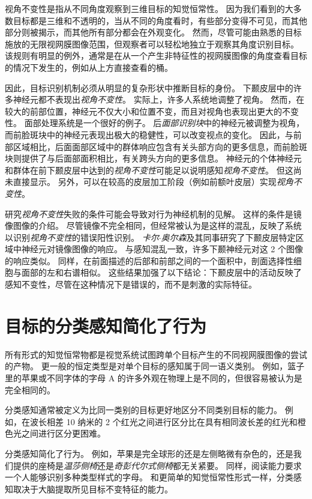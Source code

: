 视角不变性是指从不同角度观察到三维目标的知觉恒常性。
因为我们看到的大多数目标都是三维和不透明的，当从不同的角度看时，有些部分变得不可见，而其他部分则被揭示，而其他所有部分都会在外观变化。
然而，尽管可能由熟悉的目标施放的无限视网膜图像范围，但观察者可以轻松地独立于观察其角度识别目标。
该规则有明显的例外，通常是在从一个产生非特征性的视网膜图像的角度查看目标的情况下发生的，例如从上方直接查看的桶。


因此，目标识别机制必须从明显的复杂形状中推断目标的身份。
下颞皮层中的许多神经元都不表现出\textit{视角不变性}。
实际上，许多人系统地调整了视角。
然而，在较大的前部位置，神经元不仅大小和位置不变，而且对视角也表现出更大的不变性。
面部处理系统是一个很好的例子。
后\textit{面部识别块}中的神经元被调整为视角，而前脸斑块中的神经元表现出极大的稳健性，可以改变视点的变化。
因此，与前部区域相比，后面面部区域中的群体响应包含有关头部方向的更多信息，而前脸斑块则提供了与后面部面积相比，有关跨头方向的更多信息。
神经元的个体神经元和群体在前下颞皮层中达到的\textit{视角不变性}可能足以说明感知\textit{视角不变性}。
但这尚未直接显示。
另外，可以在较高的皮层加工阶段（例如前额叶皮层）实现\textit{视角不变性}。


研究\textit{视角不变性}失败的条件可能会导致对行为神经机制的见解。
这样的条件是镜像图像的介绍。
尽管镜像不完全相同，但经常被认为是这样的混乱，反映了系统以识别\textit{视角不变性}的错误阳性识别。
\textit{卡尔$\cdot$奥尔森}及其同事研究了下颞皮层特定区域中神经元对镜像图像的响应\cite{rollenhagen2000mirror}。
与感知混乱一致，许多下颞神经元对这 2 个图像的响应类似。
同样，在前面描述的后部和前部之间的一个面积中，剖面选择性细胞与面部的左和右谱相似。
这些结果加强了以下结论：下颞皮层中的活动反映了感知不变性，尽管在这种情况下是错误的，而不是刺激的实际特征。



\section{目标的分类感知简化了行为}

所有形式的知觉恒常物都是视觉系统试图跨单个目标产生的不同视网膜图像的尝试的产物。
更一般的恒定类型是对单个目标的感知属于同一语义类别。
例如，篮子里的苹果或不同字体的字母 A 的许多外观在物理上是不同的，但很容易被认为是完全相同的。


分类感知通常被定义为比同一类别的目标更好地区分不同类别目标的能力。
例如，在波长相差 10 纳米的 2 个红光之间进行区分比在具有相同波长差的红光和橙色光之间进行区分更困难。


分类感知简化了行为。
例如，苹果是完全球形的还是左侧略微有杂色的，还是我们提供的座椅是\textit{温莎侧椅}还是\textit{奇彭代尔式侧椅}都无关紧要。
同样，阅读能力要求一个人能够识别多种类型样式的字母。
和更简单的知觉恒常性形式一样，分类感知取决于大脑提取所见目标不变特征的能力。


